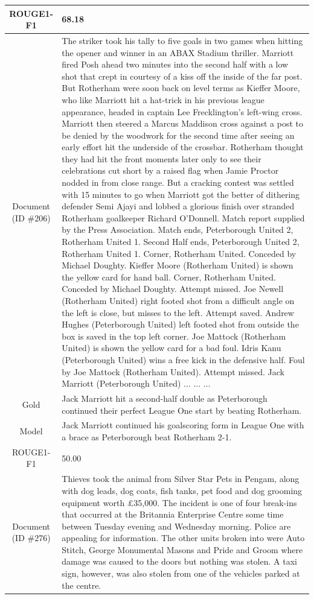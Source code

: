 \begin{table}[bth!]
\begin{tabular}{c|p{}}
\\ \hline
ROUGE1-F1 & 
68.18
\\ \hline
\makecell{Document\\(ID \#206)} & 
The striker took his tally to five goals in two games when hitting the opener and winner in an ABAX Stadium thriller. Marriott fired Posh ahead two minutes into the second half with a low shot that crept in courtesy of a kiss off the inside of the far post. But Rotherham were soon back on level terms as Kieffer Moore, who like Marriott hit a hat-trick in his previous league appearance, headed in captain Lee Frecklington's left-wing cross. Marriott then steered a Marcus Maddison cross against a post to be denied by the woodwork for the second time after seeing an early effort hit the underside of the crossbar. Rotherham thought they had hit the front moments later only to see their celebrations cut short by a raised flag when Jamie Proctor nodded in from close range. But a cracking contest was settled with 15 minutes to go when Marriott got the better of dithering defender Semi Ajayi and lobbed a glorious finish over stranded Rotherham goalkeeper Richard O'Donnell. Match report supplied by the Press Association. Match ends, Peterborough United 2, Rotherham United 1. Second Half ends, Peterborough United 2, Rotherham United 1. Corner, Rotherham United. Conceded by Michael Doughty. Kieffer Moore (Rotherham United) is shown the yellow card for hand ball. Corner, Rotherham United. Conceded by Michael Doughty. Attempt missed. Joe Newell (Rotherham United) right footed shot from a difficult angle on the left is close, but misses to the left. Attempt saved. Andrew Hughes (Peterborough United) left footed shot from outside the box is saved in the top left corner. Joe Mattock (Rotherham United) is shown the yellow card for a bad foul. Idris Kanu (Peterborough United) wins a free kick in the defensive half. Foul by Joe Mattock (Rotherham United). Attempt missed. Jack Marriott (Peterborough United) ... ... ... 
\\ \hline
Gold & 
Jack Marriott hit a second-half double as Peterborough continued their perfect League One start by beating Rotherham.
\\ \hline
Model & 
Jack Marriott continued his goalscoring form in League One with a brace as Peterborough beat Rotherham 2-1.
\\ \hline
ROUGE1-F1 & 
50.00
\\ \hline
\makecell{Document\\(ID \#276)} & 
Thieves took the animal from Silver Star Pets in Pengam, along with dog leads, dog coats, fish tanks, pet food and dog grooming equipment worth £35,000. The incident is one of four break-ins that occurred at the Britannia Enterprise Centre some time between Tuesday evening and Wednesday morning. Police are appealing for information. The other units broken into were Auto Stitch, George Monumental Masons and Pride and Groom where damage was caused to the doors but nothing was stolen. A taxi sign, however, was also stolen from one of the vehicles parked at the centre.

\end{tabular}
\end{table}
